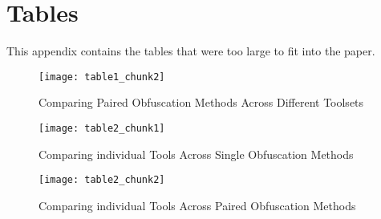 \documentclass[sigplan,10pt,review, nonacm=true]{acmart}\settopmatter{printfolios=true,printccs=false,printacmref=false}
\begin{document}


\appendix

\section{Tables} This appendix contains the tables that were too large to fit into the paper.

\begin{figure*}
    \texttt{[image: table1\_chunk2]}
    \caption{Comparing Paired Obfuscation Methods Across Different Toolsets}
    \label{fig:table1_chunk2}
\end{figure*}

\begin{figure*}
    \texttt{[image: table2\_chunk1]}
    \caption{Comparing individual Tools Across Single Obfuscation Methods}
    \label{fig:table2_chunk1}
\end{figure*}

\begin{figure*}
    \texttt{[image: table2\_chunk2]}
    \caption{Comparing individual Tools Across Paired Obfuscation Methods}
    \label{fig:table2_chunk2}
\end{figure*}
\end{document}
